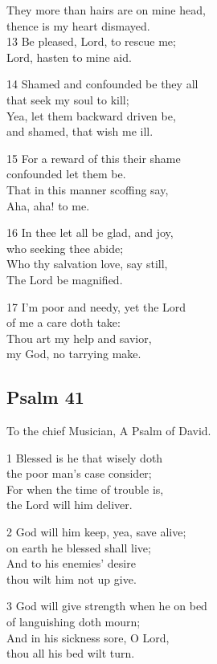 They more than hairs are on mine head,\\
thence is my heart dismayed.\\
13 Be pleased, Lord, to rescue me;\\
Lord, hasten to mine aid.

14 Shamed and confounded be they all\\
that seek my soul to kill;\\
Yea, let them backward driven be,\\
and shamed, that wish me ill.

15 For a reward of this their shame\\
confounded let them be.\\
That in this manner scoffing say,\\
Aha, aha! to me.

16 In thee let all be glad, and joy,\\
who seeking thee abide;\\
Who thy salvation love, say still,\\
The Lord be magnified.

17 I’m poor and needy, yet the Lord\\
of me a care doth take:\\
Thou art my help and savior,\\
my God, no tarrying make.

\begin{center}
\quad{}\quad{}
\end{center}

\subsection*{Psalm 41}

To the chief Musician,
A Psalm of David.

1 Blessed is he that wisely doth\\
the poor man’s case consider;\\
For when the time of trouble is,\\
the Lord will him deliver.

2 God will him keep, yea, save alive;\\
on earth he blessed shall live;\\
And to his enemies’ desire\\
thou wilt him not up give.

3 God will give strength when he on bed\\
of languishing doth mourn;\\
And in his sickness sore, O Lord,\\
thou all his bed wilt turn.

